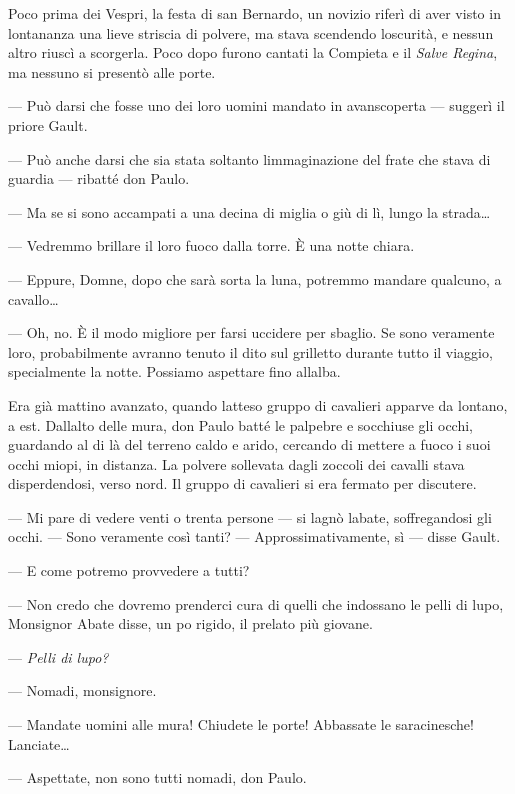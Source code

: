 Poco prima dei Vespri, la festa di san Bernardo, un novizio riferì di
aver visto in lontananza una lieve striscia di polvere, ma stava
scendendo l\textquotesingle oscurità, e nessun altro riuscì a scorgerla.
Poco dopo furono cantati la Compieta e il \emph{Salve Regina}, ma
nessuno si presentò alle porte.

--- Può darsi che fosse uno dei loro uomini mandato in avanscoperta ---
suggerì il priore Gault.

--- Può anche darsi che sia stata soltanto
l\textquotesingle immaginazione del frate che stava di guardia ---
ribatté don Paulo.

--- Ma se si sono accampati a una decina di miglia o giù di lì, lungo la
strada\ldots{}

--- Vedremmo brillare il loro fuoco dalla torre. È una notte chiara.

--- Eppure, Domne, dopo che sarà sorta la luna, potremmo mandare
qualcuno, a cavallo\ldots{}

--- Oh, no. È il modo migliore per farsi uccidere per sbaglio. Se sono
veramente loro, probabilmente avranno tenuto il dito sul grilletto
durante tutto il viaggio, specialmente la notte. Possiamo aspettare fino
all\textquotesingle alba.

Era già mattino avanzato, quando l\textquotesingle atteso gruppo di
cavalieri apparve da lontano, a est. Dall\textquotesingle alto delle
mura, don Paulo batté le palpebre e socchiuse gli occhi, guardando al di
là del terreno caldo e arido, cercando di mettere a fuoco i suoi occhi
miopi, in distanza. La polvere sollevata dagli zoccoli dei cavalli stava
disperdendosi, verso nord. Il gruppo di cavalieri si era fermato per
discutere.

--- Mi pare di vedere venti o trenta persone --- si lagnò
l\textquotesingle abate, soffregandosi gli occhi. --- Sono veramente
così tanti? --- Approssimativamente, sì --- disse Gault.

--- E come potremo provvedere a tutti?

--- Non credo che dovremo prenderci cura di quelli che indossano le
pelli di lupo, Monsignor Abate disse, un po\textquotesingle{} rigido, il
prelato più giovane.

--- \emph{Pelli di lupo?}

--- Nomadi, monsignore.

--- Mandate uomini alle mura! Chiudete le porte! Abbassate le
saracinesche! Lanciate\ldots{}

--- Aspettate, non sono tutti nomadi, don Paulo.


